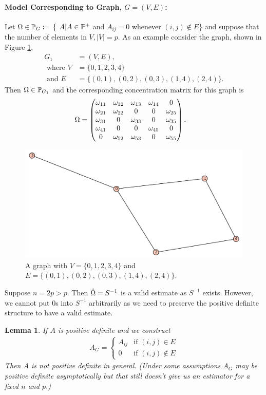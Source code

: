 \documentclass[12pt, leqno]{article}
\providecommand{\abs}[1]{\lvert#1\rvert}
\let\oldhat\hat
\renewcommand{\hat}[1]{\oldhat{{#1}}}
\def\om{\ensuremath\Omega}
\def\pd{\ensuremath\mathbb{P}^+}
\def\pg{\ensuremath\mathbb{P}_{{G}}}
\newtheorem{lemma}{Lemma}[]
\begin{document}
\paragraph{Model Corresponding to Graph, $G = (V,E)$:} 
Let $\om \in \pg \coloneqq $ \{ $A| A \in \pd$ and $A_{ij} = 0$ whenever
$(i,j) \not\in E$\} and suppose that the number of elements in $V,
\abs{V} =p$. As an example consider the graph, shown in Figure \ref{omgraph},
\begin{align*}
G_1 &= (V,E), \\
\text{ where } V &= \{0,1,2,3,4\} \\
\text{ and } E &= \{(0,1),(0,2),(0,3),(1,4),(2,4)\}.
\end{align*}
Then $\om \in
\mathbb{P}_{G_1}$ and
the corresponding concentration matrix for this graph is 
\begin{align*}
\om &=  \begin{pmatrix}
\omega_{11}&\omega_{12}&\omega_{13}&\omega_{14}&0\\ 
\omega_{21}&\omega_{22}&0&0&\omega_{25}\\ 
\omega_{31}&0 &\omega_{33}&0&\omega_{35}\\ 
\omega_{41}&0&0&\omega_{45}&0\\ 
0&\omega_{52} &\omega_{53}&0&\omega_{55}
\end{pmatrix}.
\end{align*}
\begin{figure}
\begin{center}
  \includegraphics [scale=0.4]{h01.pdf}
\end{center}
\caption{A graph with $V = \{0,1,2,3,4\}$ and $E = \{(0,1),(0,2),(0,3),(1,4),(2,4)\}$.}
\label{omgraph}
\end{figure}
Suppose $n=2p>p$. Then $\hat{\om} = S^{-1}$ is a valid estimate as $
S^{-1}$ exists. However, we cannot put 0s into $S^{-1}$ arbitrarily
as we need to preserve the positive definite structure to have a valid
estimate. 
\begin{lemma} If $A$ is positive definite and we construct 
\begin{align*}
 A_{G} =
  \begin{cases}
   A_{ij} & \text{if } (i,j) \in E \\
   0       & \text{if } (i,j) \not\in E 
  \end{cases}
\end{align*}
Then $A$ is not positive definite in general. (Under some assumptions
$A_G$ may be positive definite asymptotically but that still doesn't
give us an estimator for a fixed $n$ and $p$.)
\end{lemma}
\end{document}
